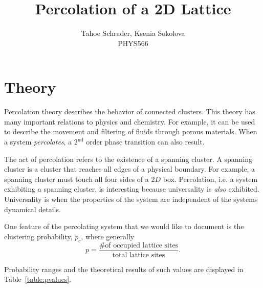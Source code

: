 \documentclass[12pt]{article}
\title{Percolation of a 2D Lattice}
\author{Tahoe Schrader, Ksenia Sokolova \\PHYS566}
\date{}
\begin{document}
\maketitle



\section{Theory}
\label{sec:theory}
Percolation theory describes the behavior of connected clusters. This theory has many important relations to physics and chemistry. For example, it can be used to describe the movement and filtering of fluids through porous materials. When a system \emph{percolates}, a $2^\text{nd}$ order phase transition can also result.

The act of percolation refers to the existence of a spanning cluster. A spanning cluster is a cluster that reaches all edges of a physical boundary. For example, a spanning cluster must touch all four sides of a $2D$ box. Percolation, i.e. a system exhibiting a spanning cluster, is interesting because universality is \emph{also} exhibited. Universality is when the properties of the system are independent of the systems dynamical details.

One feature of the percolating system that we would like to document is the clustering probability, $p_c$, where generally
\begin{equation}
  \label{eq:probability}
  p = \frac{\text{\# of occupied lattice sites}}{\text{total lattice sites}}.
\end{equation}

Probability ranges and the theoretical results of such values are displayed in Table~\ref{table:pvalues}.
\begin{table}[!htb]
\end{table}
\end{document}
